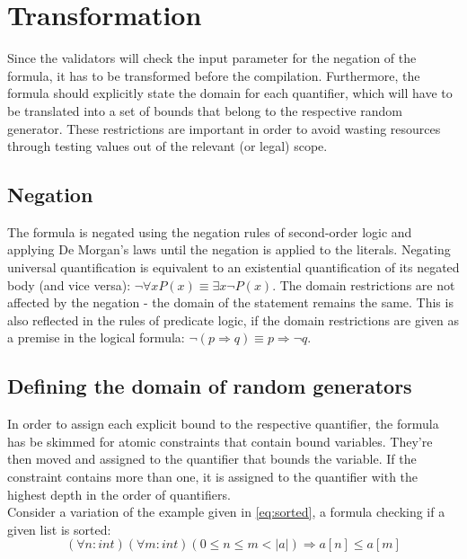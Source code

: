 %

\section{Transformation}\label{sec:transformation}
Since the validators will check the input parameter for the negation of the formula, it has to be transformed before the compilation. Furthermore, the formula should explicitly state the domain for each quantifier, which will have to be translated into a set of bounds that belong to the respective random generator. These restrictions are important in order to avoid wasting resources through testing values out of the relevant (or legal) scope.

\subsection{Negation}
The formula is negated using the negation rules of second-order logic and applying De Morgan's laws until the negation is applied to the literals. Negating universal quantification is equivalent to an existential quantification of its negated body (and vice versa): $\neg \forall x P(x) \equiv \exists x \neg P(x)$. The domain restrictions are not affected by the negation - the domain of the statement remains the same. This is also reflected in the rules of predicate logic, if the domain restrictions are given as a premise in the logical formula: $\neg (p \Rightarrow q) \equiv p \Rightarrow \neg q $.


\subsection{Defining the domain of random generators}
In order to assign each explicit bound to the respective quantifier, the formula has be skimmed for atomic constraints that contain bound variables. They're then moved and assigned to the quantifier that bounds the variable. If the constraint contains more than one, it is assigned to the quantifier with the highest depth in the order of quantifiers. \\
Consider a variation of the example given in \eqref{eq:sorted}, a formula checking if a given list is sorted:
\begin{equation}\label{eq:sorted_v2}
	(\forall n : int)(\forall m : int) (0 \leq n \le m < |a|) \Rightarrow a[n] \leq a[m]
\end{equation}

